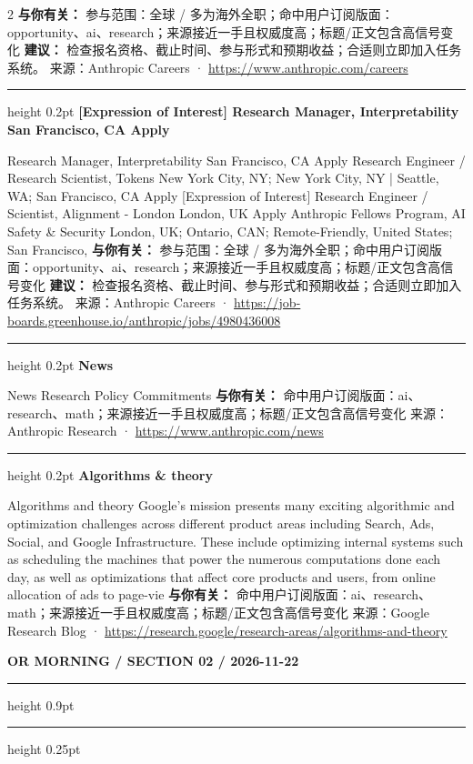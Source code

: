 \documentclass[10.5pt]{ctexart}
\begin{document}
\begin{multicols}{2}
\textbf{与你有关：} 参与范围：全球 / 多为海外全职；命中用户订阅版面：opportunity、ai、research；来源接近一手且权威度高；标题/正文包含高信号变化
\textbf{建议：} 检查报名资格、截止时间、参与形式和预期收益；合适则立即加入任务系统。
{\footnotesize\color{ormuted} 来源：Anthropic Careers · \url{https://www.anthropic.com/careers}}
\vspace{2mm}
\hrule height 0.2pt
\vspace{2mm}
{\large\bfseries [Expression of Interest] Research Manager, Interpretability San Francisco, CA Apply}\par
[Expression of Interest] Research Manager, Interpretability San Francisco, CA Apply Research Engineer / Research Scientist, Tokens New York City, NY; New York City, NY | Seattle, WA; San Francisco, CA Apply [Expression of Interest] Research Engineer / Scientist, Alignment - London London, UK Apply Anthropic Fellows Program, AI Safety \& Security London, UK; Ontario, CAN; Remote-Friendly, United States; San Francisco, 
\textbf{与你有关：} 参与范围：全球 / 多为海外全职；命中用户订阅版面：opportunity、ai、research；来源接近一手且权威度高；标题/正文包含高信号变化
\textbf{建议：} 检查报名资格、截止时间、参与形式和预期收益；合适则立即加入任务系统。
{\footnotesize\color{ormuted} 来源：Anthropic Careers · \url{https://job-boards.greenhouse.io/anthropic/jobs/4980436008}}
\vspace{2mm}
\hrule height 0.2pt
\vspace{2mm}
{\large\bfseries News}\par
News Research Policy Commitments
\textbf{与你有关：} 命中用户订阅版面：ai、research、math；来源接近一手且权威度高；标题/正文包含高信号变化
{\footnotesize\color{ormuted} 来源：Anthropic Research · \url{https://www.anthropic.com/news}}
\vspace{2mm}
\hrule height 0.2pt
\vspace{2mm}
{\large\bfseries Algorithms \& theory}\par
Algorithms and theory Google’s mission presents many exciting algorithmic and optimization challenges across different product areas including Search, Ads, Social, and Google Infrastructure. These include optimizing internal systems such as scheduling the machines that power the numerous computations done each day, as well as optimizations that affect core products and users, from online allocation of ads to page-vie
\textbf{与你有关：} 命中用户订阅版面：ai、research、math；来源接近一手且权威度高；标题/正文包含高信号变化
{\footnotesize\color{ormuted} 来源：Google Research Blog · \url{https://research.google/research-areas/algorithms-and-theory}}
\end{multicols}
\newpage
{\small\bfseries OR MORNING / SECTION 02 / 2026-11-22}
\vspace{2mm}
\hrule height 0.9pt
\vspace{1.5mm}
\hrule height 0.25pt
\vspace{4mm}
\end{document}
